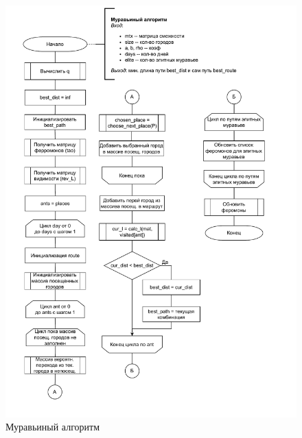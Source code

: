 \begin{figure}[H]
	\begin{center}
		\includegraphics[scale=0.7]{img/ants.pdf}
	\end{center}
	\captionsetup{justification=centering}
	\caption{Муравьиный алгоритм}
	\label{img:ant}
\end{figure}


